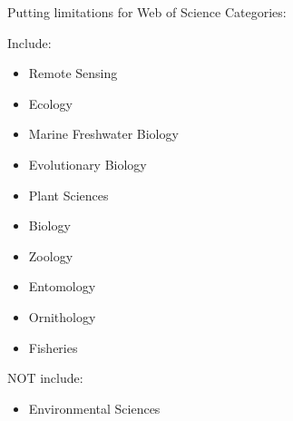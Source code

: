 \documentclass{article}
\newcommand{\bei}{\begin{itemize}}
\newcommand{\eei}{\end{itemize}}
\begin{document}
Putting limitations for Web of Science Categories:

Include:
\bei
\item Remote Sensing
\item Ecology
\item Marine Freshwater Biology
\item Evolutionary Biology
\item Plant Sciences
\item Biology
\item Zoology
\item Entomology
\item Ornithology
\item Fisheries
\eei
NOT include:
\bei
\item Environmental Sciences
\eei
\end{document}
